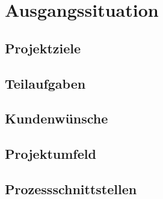
\section{Ausgangssituation}
\label{sec:ausgangssituation}

\subsection{Projektziele}
\label{subsec:projektziele}

\subsection{Teilaufgaben}
\label{subsec:teilaufgaben}

\subsection{Kundenwünsche}
\label{subsec:kundenwuensche}

\subsection{Projektumfeld}
\label{subsec:projektumfeld}

\subsection{Prozessschnittstellen}
\label{subsec:prozessschnittstellen}